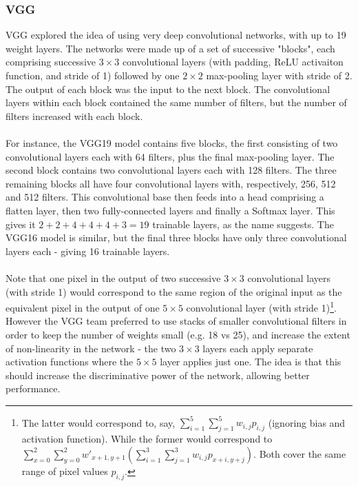 \documentclass[11pt]{article} %
\theoremstyle{plain}
\theoremstyle{definition}
\begin{document}
\subsubsection{VGG}
VGG \cite{VGG_Paper} explored the idea of using very deep convolutional networks, with up to 19 weight layers. The networks were made up of a set of successive "blocks", each comprising successive \(3 \times 3\)  convolutional layers (with padding, ReLU activaiton function, and stride of 1) followed by one \(2 \times 2\) max-pooling layer with stride of 2. The output of each block was the input to the next block. The convolutional layers within each block contained the same number of filters, but the number of filters increased with each block. 
\\
\\
\noindent
For instance, the VGG19 model contains five blocks, the first consisting of two convolutional layers each with 64 filters, plus the final max-pooling layer. The second block contains two convolutional layers each with 128 filters. The three remaining blocks all have four convolutional layers with, respectively, 256, 512 and 512 filters. This convolutional base then feeds into a head comprising a flatten layer, then two fully-connected layers and finally a Softmax layer. This gives it \(2 + 2 + 4 + 4 + 4 + 3 = 19\) trainable layers, as the name suggests. The VGG16 model is similar, but the final three blocks have only three convolutional layers each - giving 16 trainable layers. 
\\
\\
\noindent
Note that one pixel in the output of two successive \(3 \times 3\) convolutional layers (with stride 1) would correspond to the same region of the original input as the equivalent pixel in the output of one \(5 \times 5\) convolutional layer (with stride 1)\footnote{The latter would correspond to, say, \( \sum_{i=1}^5 \sum_{j=1}^5 w_{i,j}p_{i,j} \) (ignoring bias and activation function). While the former would correspond to \( \sum_{x=0}^2 \sum_{y=0}^2 w'_{x+1,y+1}(\sum_{i=1}^3 \sum_{j=1}^3 w_{i,j}p_{x+i,y+j}) \). Both cover the same range of pixel values \(p_{i,j}\).}. However the VGG team preferred to use stacks of smaller convolutional filters in order to keep the number of weights small (e.g. 18 vs 25), and increase the extent of non-linearity in the network - the two \(3 \times 3\) layers each apply separate activation functions where the \(5 \times 5\) layer applies just one. The idea is that this should increase the discriminative power of the network, allowing better performance.
\end{document}
